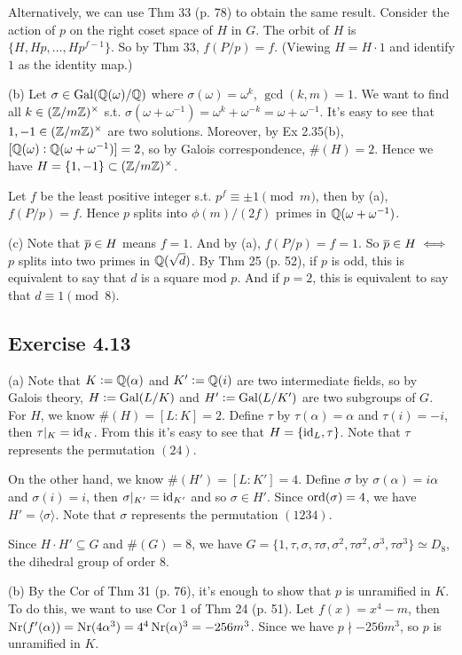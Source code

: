 \documentclass[../Marcus.tex]{subfiles}
\begin{document}
Alternatively, we can use Thm 33 (p. 78) to obtain the same result. Consider the action of $p$ on the right coset space of $H$ in $G$. The orbit of $H$ is $\{H,Hp,\ldots,Hp^{f-1}\}$. So by Thm 33, $f(P/p)=f$. (Viewing $H=H\cdot 1$ and identify $1$ as the identity map.)

(b) Let $\sigma\in\operatorname{Gal}(\mathbb{Q}(\omega)/\mathbb{Q})$ where $\sigma(\omega)=\omega^k$, $\gcd(k,m)=1$. We want to find all $k\in(\mathbb{Z}/m\mathbb{Z})^\times$ s.t. $\sigma(\omega+\omega^{-1})=\omega^k+\omega^{-k}=\omega+\omega^{-1}$. It's easy to see that $1,-1\in(\mathbb{Z}/m\mathbb{Z})^\times$ are two solutions. Moreover, by Ex 2.35(b), $[\mathbb{Q}(\omega):\mathbb{Q}(\omega+\omega^{-1})]=2$, so by Galois correspondence, $\#(H)=2$. Hence we have $H=\{1,-1\}\subset(\mathbb{Z}/m\mathbb{Z})^\times$.

Let $f$ be the least positive integer s.t. $p^f \equiv \pm1\pmod{m}$, then by (a), $f(P/p)=f$. Hence $p$ splits into $\phi(m)/(2f)$ primes in $\mathbb{Q}(\omega+\omega^{-1})$.

(c) Note that $\overline{p}\in H$ means $f=1$. And by (a), $f(P/p)=f=1$. So $\overline{p}\in H \iff$ $p$ splits into two primes in $\mathbb{Q}(\sqrt{d})$. By Thm 25 (p. 52), if $p$ is odd, this is equivalent to say that $d$ is a square mod $p$. And if $p=2$, this is equivalent to say that $d\equiv 1\pmod{8}$.

\subsection*{Exercise 4.13}

(a) Note that $K:=\mathbb{Q}(\alpha)$ and $K':=\mathbb{Q}(i)$ are two intermediate fields, so by Galois theory, $H:=\operatorname{Gal}(L/K)$ and $H':=\operatorname{Gal}(L/K')$ are two subgroups of $G$.
For $H$, we know $\#(H)=[L:K]=2$. Define $\tau$ by $\tau(\alpha)=\alpha$ and $\tau(i)=-i$, then $\tau|_K=\operatorname{id}_K$. From this it's easy to see that $H=\{\operatorname{id}_L,\tau\}$. Note that $\tau$ represents the permutation $(24)$.

On the other hand, we know $\#(H')=[L:K']=4$. Define $\sigma$ by $\sigma(\alpha)=i\alpha$ and $\sigma(i)=i$, then $\sigma|_{K'}=\operatorname{id}_{K'}$ and so $\sigma\in H'$. Since $\operatorname{ord}(\sigma)=4$, we have $H'=\langle\sigma\rangle$. Note that $\sigma$ represents the permutation $(1234)$.

Since $H\cdot H'\subseteq G$ and $\#(G)=8$, we have $G=\{1,\tau,\sigma,\tau\sigma,\sigma^2,\tau\sigma^2,\sigma^3,\tau\sigma^3\}\simeq D_8$, the dihedral group of order $8$.

(b) By the Cor of Thm 31 (p. 76), it's enough to show that $p$ is unramified in $K$. To do this, we want to use Cor 1 of Thm 24 (p. 51). Let $f(x)=x^4-m$, then $\operatorname{Nr}(f'(\alpha))=\operatorname{Nr}(4\alpha^3)=4^4\operatorname{Nr}(\alpha)^3=-256m^3$. Since we have $p\nmid -256m^3$, so $p$ is unramified in $K$. 
\end{document}
